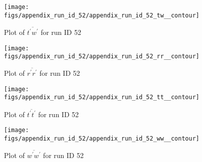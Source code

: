 \begin{figure}[H]
\centering
\texttt{[image: figs/appendix\_run\_id\_52/appendix\_run\_id\_52\_tw\_\_contour]}
\caption{Plot of $\overline{t^\prime w^\prime}$ for run ID 52}
\label{fig:appendix_run_id_52_tw__contour}
\end{figure}


\begin{figure}[H]
\centering
\texttt{[image: figs/appendix\_run\_id\_52/appendix\_run\_id\_52\_rr\_\_contour]}
\caption{Plot of $\overline{r^\prime r^\prime}$ for run ID 52}
\label{fig:appendix_run_id_52_rr__contour}
\end{figure}


\begin{figure}[H]
\centering
\texttt{[image: figs/appendix\_run\_id\_52/appendix\_run\_id\_52\_tt\_\_contour]}
\caption{Plot of $\overline{t^\prime t^\prime}$ for run ID 52}
\label{fig:appendix_run_id_52_tt__contour}
\end{figure}


\begin{figure}[H]
\centering
\texttt{[image: figs/appendix\_run\_id\_52/appendix\_run\_id\_52\_ww\_\_contour]}
\caption{Plot of $\overline{w^\prime w^\prime}$ for run ID 52}
\label{fig:appendix_run_id_52_ww__contour}
\end{figure}


